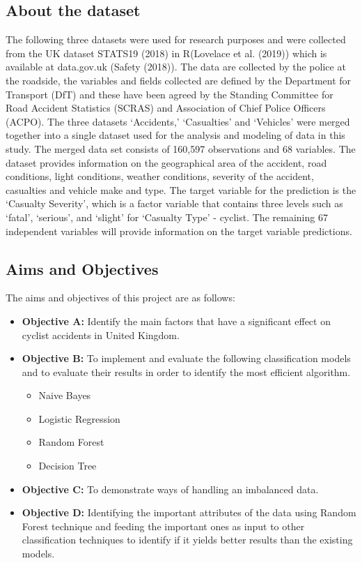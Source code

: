 \documentclass[
  a4paper,
]{article}
\providecommand{\tightlist}{%
  \setlength{\itemsep}{0pt}\setlength{\parskip}{0pt}}
\begin{document}
\hypertarget{about-the-dataset}{%
\subsection{About the dataset}\label{about-the-dataset}}

The following three datasets were used for research purposes and were
collected from the UK dataset STATS19 (2018) in R(Lovelace et al.
(2019)) which is available at data.gov.uk (Safety (2018)). The data are
collected by the police at the roadside, the variables and fields
collected are defined by the Department for Transport (DfT) and these
have been agreed by the Standing Committee for Road Accident Statistics
(SCRAS) and Association of Chief Police Officers (ACPO). The three
datasets `Accidents,' `Casualties' and `Vehicles' were merged together
into a single dataset used for the analysis and modeling of data in this
study. The merged data set consists of 160,597 observations and 68
variables. The dataset provides information on the geographical area of
the accident, road conditions, light conditions, weather conditions,
severity of the accident, casualties and vehicle make and type. The
target variable for the prediction is the `Casualty Severity', which is
a factor variable that contains three levels such as `fatal', `serious',
and `slight' for `Casualty Type' - cyclist. The remaining 67 independent
variables will provide information on the target variable predictions.

\hypertarget{aims-and-objectives}{%
\subsection{Aims and Objectives}\label{aims-and-objectives}}

The aims and objectives of this project are as follows:

\begin{itemize}
\item
  \textbf{Objective A:} Identify the main factors that have a
  significant effect on cyclist accidents in United Kingdom.
\item
  \textbf{Objective B:} To implement and evaluate the following
  classification models and to evaluate their results in order to
  identify the most efficient algorithm.

  \begin{itemize}
  \tightlist
  \item
    Naive Bayes
  \item
    Logistic Regression
  \item
    Random Forest
  \item
    Decision Tree
  \end{itemize}
\item
  \textbf{Objective C:} To demonstrate ways of handling an imbalanced
  data.
\item
  \textbf{Objective D:} Identifying the important attributes of the data
  using Random Forest technique and feeding the important ones as input
  to other classification techniques to identify if it yields better
  results than the existing models.
\end{itemize}
\end{document}

